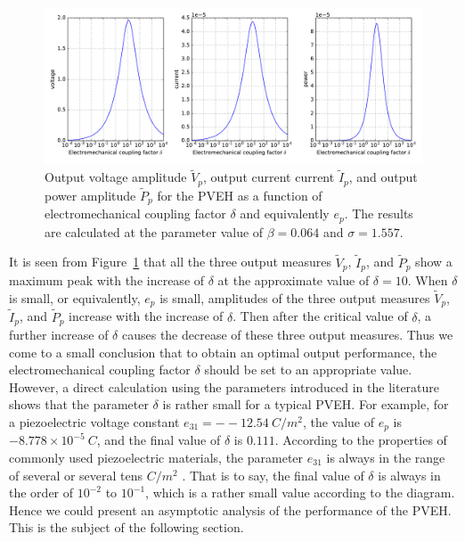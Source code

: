 \documentclass{article}
\begin{document}
\begin{figure}[!htbp]
    \centering
    \includegraphics[width=\textwidth]{./img_eig_asy/fig_sol_analytic_perf_fun}
    \caption{Output voltage amplitude $\tilde{V}_p$, output current current $\tilde{I}_p$, and output power amplitude $\tilde{P}_p$ for the PVEH as a function of electromechanical coupling factor $\delta$ and equivalently $e_p$. The results are calculated at the parameter value of $\beta = 0.064$ and $\sigma = 1.557$.}
    \label{fig:fig_sol_analytic_perf_fun}
\end{figure}


It is seen from Figure~\ref{fig:fig_sol_analytic_perf_fun} that all the three output measures $\tilde{V}_p$, $\tilde{I}_p$, and $\tilde{P}_p$ show a maximum peak with the increase of $\delta$ at the approximate value of $\delta = 10$. When $\delta$ is small, or equivalently, $e_p$ is small, amplitudes of the three output measures $\tilde{V}_p$, $\tilde{I}_p$, and $\tilde{P}_p$ increase with the increase of $\delta$. Then after the critical value of $\delta$, a further increase of $\delta$ causes the decrease of these three output measures. Thus we come to a small conclusion that to obtain an optimal output performance, the electromechanical coupling factor $\delta$ should be set to an appropriate value. However, a direct calculation using the parameters introduced in the literature \cite{erturk2008distributed,erturk2009experimentally} shows that the parameter $\delta$ is rather small for a typical PVEH. For example, for a piezoelectric voltage constant $e_{31} = --12.54\ C / m^2$, the value of $e_p$ is $-8.778 \times 10^{-5}\ C$, and the final value of $\delta$ is $0.111$. According to the properties of commonly used piezoelectric materials, the parameter $e_{31}$ is always in the range of several or several tens $C / m^2$ \cite{erturk2011piezoelectric}. That is to say, the final value of $\delta$ is always in the order of $10^{-2}$ to $10^{-1}$, which is a rather small value according to the diagram. Hence we could present an asymptotic analysis of the performance of the PVEH. This is the subject of the following section.
\end{document}
